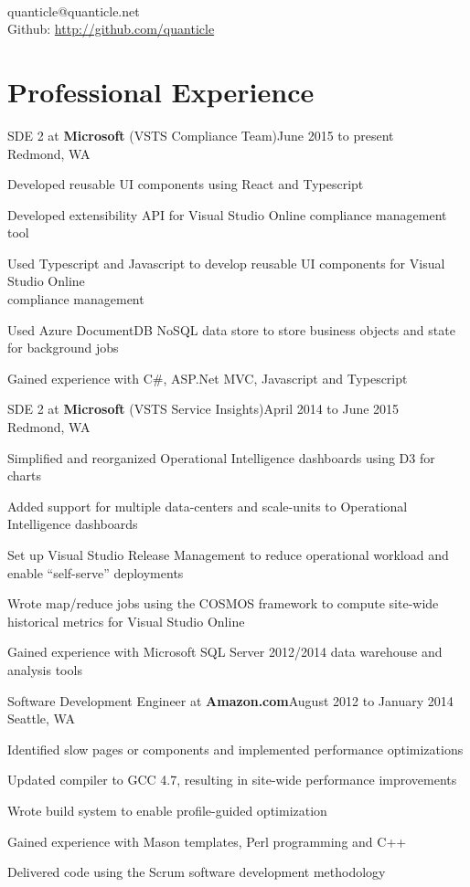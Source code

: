 \documentclass[letterpaper]{article}
\newenvironment{resume-list}
{\begin{itemize}
 \setlength{\itemsep}{0pt}
 \setlength{\parskip}{0pt}}
{\end{itemize}}
\begin{document}
\\
{\small quanticle@quanticle.net}\\
{\small Github: \url{http://github.com/quanticle}}\\
\section*{Professional Experience}
\noindent SDE 2 at {\bfseries Microsoft} (VSTS Compliance Team)\dotfill June 2015 to present\\
Redmond, WA
\begin{resume-list}
\item Developed reusable UI components using React and Typescript
\item Developed extensibility API for Visual Studio Online compliance management tool
\item Used Typescript and Javascript to develop reusable UI components for Visual Studio Online\\
      compliance management
\item Used Azure DocumentDB NoSQL data store to store business objects and state for background jobs
\item Gained experience with C\#, ASP.Net MVC, Javascript and Typescript
\end{resume-list}
\noindent SDE 2 at {\bfseries Microsoft} (VSTS Service Insights)\dotfill April 2014 to June 2015\\
Redmond, WA
\begin{resume-list}
\item Simplified and reorganized Operational Intelligence dashboards using D3 for charts
\item Added support for multiple data-centers and scale-units to Operational Intelligence dashboards
\item Set up Visual Studio Release Management to reduce operational workload and enable ``self-serve'' deployments
\item Wrote map/reduce jobs using the COSMOS framework to compute site-wide historical metrics for Visual Studio Online
\item Gained experience with Microsoft SQL Server 2012/2014 data warehouse and analysis tools
\end{resume-list}
\noindent Software Development Engineer at {\bfseries Amazon.com}\dotfill August 2012 to January 2014\\
Seattle, WA
\begin{resume-list}
\item Identified slow pages or components and implemented performance optimizations
\item Updated compiler to GCC 4.7, resulting in site-wide performance improvements
\item Wrote build system to enable profile-guided optimization
\item Gained experience with Mason templates, Perl programming and C++
\item Delivered code using the Scrum software development methodology
\end{resume-list}
\end{document}
